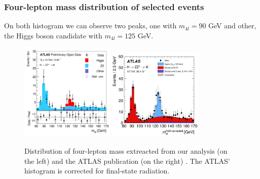 \documentclass[aspectratio=1610, english]{beamer}
\begin{document}
\begin{frame}
\frametitle{Four-lepton mass distribution of selected events}

On both histogram we can observe two peaks, one with $m_{4l} = 90 $ GeV and other, the Higgs boson candidate with $m_{4l} = 125 $ GeV.

\begin{figure} [H]
\centering
\includegraphics[width=0.4\textwidth]{mass_four_lep.png}
\includegraphics[width=0.4\textwidth]{mass_four_lep_pub.png}
\caption{ Distribution of four-lepton mass extreacted from our analysis (on the left) and the ATLAS publication (on the right) \cite{hzz}. The ATLAS' histogram is corrected for final-state radiation.}
\end{figure}

\end{frame}
\end{document}
